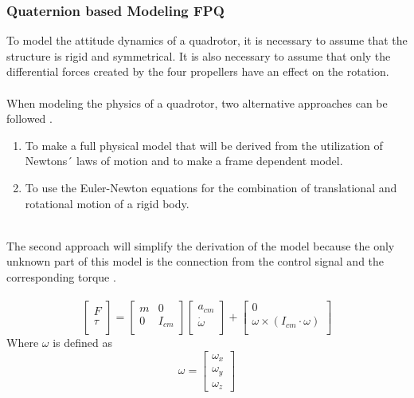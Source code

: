 \subsubsection{Quaternion based Modeling FPQ}
To model the attitude dynamics of a quadrotor, it is necessary to assume that the structure is rigid and symmetrical. It is also necessary to assume that only the differential forces created by the four propellers have an effect on the rotation.
\\\\
When modeling the physics of a quadrotor, two alternative approaches can be followed \cite{lule}. 
\begin{enumerate}
    \item To make a full physical model that will be derived from the utilization of Newtons´ laws of motion and to make a frame dependent model. %
    \item To use the Euler-Newton equations for the combination of translational and rotational motion of a rigid body. 
\end{enumerate}
\\
The second approach will simplify the derivation of the model because the only unknown part of this model is the connection from the control signal and the corresponding torque \cite{newtoneuler}. \\\\
\begin{equation}
\begin{bmatrix}
    F \\[0.3em]
    \tau\\[0.3em]
\end{bmatrix}
=
\begin{bmatrix}
    m & 0 \\[0.3em]
    0 & I_{cm}\\[0.3em]
\end{bmatrix}
\begin{bmatrix}
    a_{cm} \\[0.3em]
    \dot{\omega}\\[0.3em]
\end{bmatrix}
+ 
\begin{bmatrix}
    0 \\[0.3em]
    \omega\times(I_{cm}\cdot\omega)\\[0.3em]
\end{bmatrix}
\end{equation}
Where $\omega$ is defined as 
\begin{equation}
\omega = 
\begin{bmatrix}
    \omega_x \\[0.3em]
    \omega_y\\[0.3em]
    \omega_z
\end{bmatrix}
\end{equation}\\
